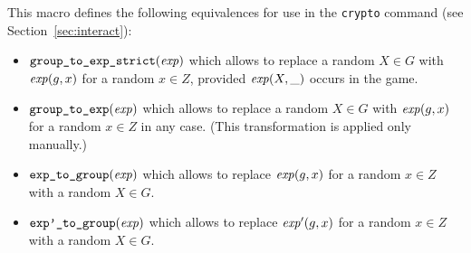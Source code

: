 \documentclass{article}
\begin{document}
\begin{itemize}
\begin{itemize}
\begin{itemize}
       This macro defines the following equivalences for use in the
       \texttt{crypto} command (see Section~\ref{sec:interact}):
       \begin{itemize}
       \item $\texttt{group\_to\_exp\_strict}(\mathit{exp})$ which allows to replace
         a random $X \in G$ with $\mathit{exp}(g,x)$ for a random $x \in Z$, provided
         $\mathit{exp}(X,\_)$ occurs in the game.
       \item $\texttt{group\_to\_exp}(\mathit{exp})$ which allows to replace
         a random $X \in G$ with $\mathit{exp}(g,x)$ for a random $x \in Z$ in any case.
         (This transformation is applied only manually.)
       \item $\texttt{exp\_to\_group}(\mathit{exp})$ which allows to replace
         $\mathit{exp}(g,x)$ for a random $x \in Z$ with a random $X \in G$.
       \item $\texttt{exp'\_to\_group}(\mathit{exp})$ which allows to replace
         $\mathit{exp'}(g,x)$ for a random $x \in Z$ with a random $X \in G$.
       \end{itemize}

\newcommand{\F}{\mathbb{F}}%
\newcommand{\red}{\mathrm{red}}%
\newcommand{\repr}{\mathrm{repr}}%
\newcommand{\modop}{\mathbin{\mathrm{mod}}}%
\newcommand{\mul}[2]{{#1}\cdot{#2}}


\end{itemize}
\end{itemize}
\end{itemize}
\end{document}
